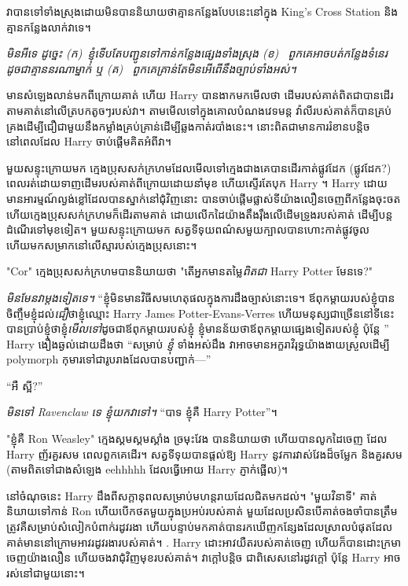 វា​បាន​ទៅ​ទាំង​ស្រុង​ដោយ​មិន​បាន​និយាយ​ថា​គ្មាន​កន្លែង​បែប​នេះ​នៅ​ក្នុង King's Cross Station និង​គ្មាន​កន្លែង​លាក់​វា​ទេ។

\emph{មិនអីទេ ដូច្នេះ (ក)~ខ្ញុំទើបតែបញ្ជូនទៅកាន់កន្លែងផ្សេងទាំងស្រុង (ខ)~ ពួកគេអាចបត់កន្លែងទំនេរដូចជាគ្មាននរណាម្នាក់ ឬ (គ)~ ពួកគេគ្រាន់តែមិនអើពើនឹងច្បាប់ទាំងអស់។}

មាន​សំឡេង​លាន់​មក​ពី​ក្រោយ​គាត់ ហើយ Harry បាន​ងាក​មក​មើល​ថា ដើម​របស់​គាត់​ពិត​ជា​បាន​ដើរ​តាម​គាត់​នៅ​លើ​ត្របក​តូចៗ​របស់​វា។ តាមមើលទៅក្នុងគោលបំណងវេទមន្ត វ៉ាលីរបស់គាត់ក៏បានគ្រប់គ្រងដើម្បីជឿជាមួយនឹងកម្លាំងគ្រប់គ្រាន់ដើម្បីឆ្លងកាត់របាំងនេះ។ នោះពិតជាមានការរំខានបន្តិចនៅពេលដែល Harry ចាប់ផ្តើមគិតអំពីវា។

មួយសន្ទុះក្រោយមក ក្មេងប្រុសសក់ក្រហមដែលមើលទៅក្មេងជាងគេបានដើរកាត់ផ្លូវដែក (ផ្លូវដែក?) ពេលរត់ដោយទាញដើមរបស់គាត់ពីក្រោយដោយនាំមុខ ហើយស្ទើរតែបុក Harry ។ Harry ដោយមានអារម្មណ៍ល្ងង់ខ្លៅដែលបានស្នាក់នៅជុំវិញនោះ បានចាប់ផ្តើមផ្លាស់ទីយ៉ាងលឿនចេញពីកន្លែងចុះចត ហើយក្មេងប្រុសសក់ក្រហមក៏ដើរតាមគាត់ ដោយលើកដៃយ៉ាងតឹងរ៉ឹងលើដើមទ្រូងរបស់គាត់ ដើម្បីបន្តដំណើរទៅមុខទៀត។ មួយសន្ទុះក្រោយមក សត្វទីទុយពណ៌សមួយក្បាលបានហោះកាត់ផ្លូវចូល ហើយមកសម្រាកនៅលើស្មារបស់ក្មេងប្រុសនោះ។

"Cor" ក្មេងប្រុសសក់ក្រហមបាននិយាយថា "តើអ្នកមានតម្លៃ\emph{ពិតជា} Harry Potter មែនទេ?"

\emph{មិនមែនវាម្តងទៀតទេ។} “ខ្ញុំមិនមានវិធីសមហេតុផលក្នុងការដឹងច្បាស់នោះទេ។ ឪពុកម្តាយរបស់ខ្ញុំបានចិញ្ចឹមខ្ញុំដល់\emph{ជឿ}ថាខ្ញុំឈ្មោះ Harry James Potter-Evans-Verres ហើយមនុស្សជាច្រើននៅទីនេះបានប្រាប់ខ្ញុំថាខ្ញុំ\emph{មើលទៅ}ដូចជាឪពុកម្តាយរបស់ខ្ញុំ ខ្ញុំមានន័យថាឪពុកម្តាយផ្សេងទៀតរបស់ខ្ញុំ ប៉ុន្តែ ” Harry ងឿងឆ្ងល់ដោយដឹងថា “សម្រាប់ \emph{ខ្ញុំ} ទាំងអស់ដឹង វាអាចមានអក្ខរាវិរុទ្ធយ៉ាងងាយស្រួលដើម្បី polymorph កុមារទៅជារូបរាងដែលបានបញ្ជាក់—”

“អឺ ស្អី?”

\emph{មិនទៅ Ravenclaw ទេ ខ្ញុំយកវាទៅ។} “បាទ ខ្ញុំគឺ Harry Potter”។

"ខ្ញុំគឺ Ron Weasley" ក្មេងស្គមស្គមស្គាំង ច្រមុះវែង បាននិយាយថា ហើយបានលូកដៃចេញ ដែល Harry ញ័រគួរសម ពេលពួកគេដើរ។ សត្វទីទុយបានផ្តល់ឱ្យ Harry នូវការវាស់វែងដ៏ចម្លែក និងគួរសម (តាមពិតទៅជាងសំឡេង eehhhhh ដែលធ្វើអោយ Harry ភ្ញាក់ផ្អើល)។

នៅចំណុចនេះ Harry ដឹងពីសក្តានុពលសម្រាប់មហន្តរាយដែលជិតមកដល់។ "មួយវិនាទី" គាត់និយាយទៅកាន់ Ron ហើយបើកថតមួយក្នុងប្រអប់របស់គាត់ មួយដែលប្រសិនបើគាត់ចងចាំបានត្រឹមត្រូវគឺសម្រាប់សំលៀកបំពាក់រដូវរងា ហើយបន្ទាប់មកគាត់បានរកឃើញកន្សែងដែលស្រាលបំផុតដែលគាត់មាននៅក្រោមអាវរដូវរងារបស់គាត់។ . Harry ដោះ​អាវ​យឺត​របស់​គាត់​ចេញ ហើយ​ក៏​បាន​ដោះ​ក្រមា​ចេញ​យ៉ាង​លឿន ហើយ​ចង​វា​ជុំវិញ​មុខ​របស់​គាត់។ វាក្តៅបន្តិច ជាពិសេសនៅរដូវក្តៅ ប៉ុន្តែ Harry អាចរស់នៅជាមួយនោះ។


